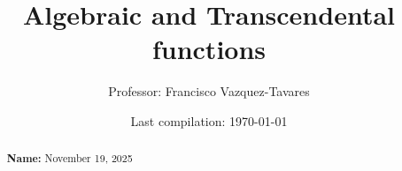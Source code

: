 \documentclass{tufte-handout} %
\title{Algebraic and Transcendental functions}
\author{Professor: Francisco Vazquez-Tavares}
\date{Last compilation: \today} %
\begin{document}
\maketitle %


\begin{abstract}
    \textbf{\large Name: }\hfill November 19, 2025
\end{abstract}

\end{document}
